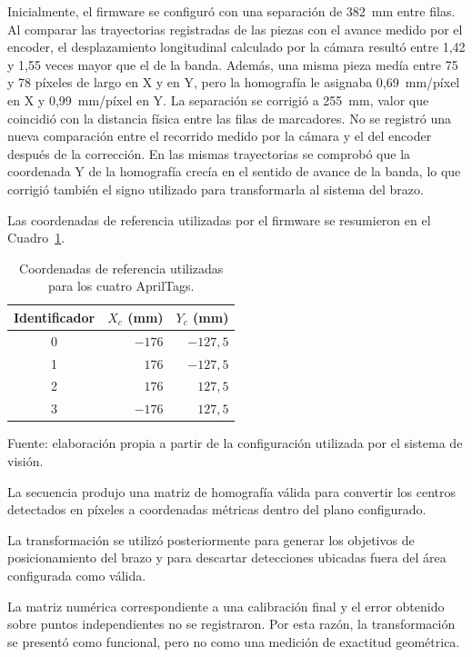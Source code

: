 Inicialmente, el firmware se configuró con una separación de 382~mm entre filas. Al comparar las trayectorias registradas de las piezas con el avance medido por el encoder, el desplazamiento longitudinal calculado por la cámara resultó entre 1,42 y 1,55 veces mayor que el de la banda. Además, una misma pieza medía entre 75 y 78 píxeles de largo en X y en Y, pero la homografía le asignaba 0,69~mm/píxel en X y 0,99~mm/píxel en Y. La separación se corrigió a 255~mm, valor que coincidió con la distancia física entre las filas de marcadores. No se registró una nueva comparación entre el recorrido medido por la cámara y el del encoder después de la corrección. En las mismas trayectorias se comprobó que la coordenada Y de la homografía crecía en el sentido de avance de la banda, lo que corrigió también el signo utilizado para transformarla al sistema del brazo.

Las coordenadas de referencia utilizadas por el firmware se resumieron en el Cuadro~\ref{tab:fase5_tags}.

\begin{table}[H]
    \centering
    \caption{Coordenadas de referencia utilizadas para los cuatro AprilTags.}
    \label{tab:fase5_tags}
    \begin{tabular}{crr}
        \hline
        Identificador & $X_c$ (mm) & $Y_c$ (mm) \\
        \hline
        0 & $-176$ & $-127{,}5$ \\
        1 & $176$ & $-127{,}5$ \\
        2 & $176$ & $127{,}5$ \\
        3 & $-176$ & $127{,}5$ \\
        \hline
    \end{tabular}

    \par\small\raggedright Fuente: elaboración propia a partir de la configuración utilizada por el sistema de visión.
\end{table}

La secuencia produjo una matriz de homografía válida para convertir los centros detectados en píxeles a coordenadas métricas dentro del plano configurado.

La transformación se utilizó posteriormente para generar los objetivos de posicionamiento del brazo y para descartar detecciones ubicadas fuera del área configurada como válida.

La matriz numérica correspondiente a una calibración final y el error obtenido sobre puntos independientes no se registraron. Por esta razón, la transformación se presentó como funcional, pero no como una medición de exactitud geométrica.


